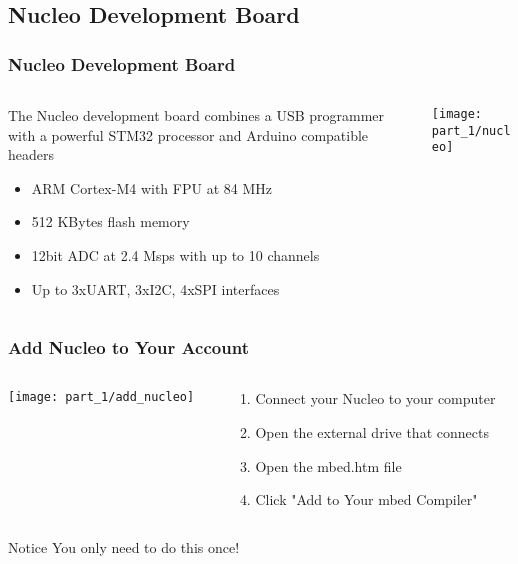 \subsection{Nucleo Development Board}
\begin{frame}
	\frametitle{Nucleo Development Board}
	\begin{columns}[T]
		\begin{column}{0.5\textwidth}
			The Nucleo development board combines a USB programmer with a powerful STM32 processor and Arduino compatible headers
			\begin{itemize}
				\item ARM Cortex-M4 with FPU at 84 MHz
				\item 512 KBytes flash memory
				\item 12bit ADC at 2.4 Msps with up to 10 channels
				\item Up to 3xUART, 3xI2C, 4xSPI interfaces
			\end{itemize}
		\end{column}
		\begin{column}{0.5\textwidth}
			\texttt{[image: part\_1/nucleo]}
		\end{column}
	\end{columns}
\end{frame}

\begin{frame}
	\frametitle{Add Nucleo to Your Account}
	\begin{columns}[c]
		\begin{column}{0.5\textwidth}
			\texttt{[image: part\_1/add\_nucleo]}
		\end{column}
		\begin{column}{0.5\textwidth}
			\begin{enumerate}
				\item Connect your Nucleo to your computer
				\item Open the external drive that connects
				\item Open the mbed.htm file
				\item Click "Add to Your mbed Compiler"
			\end{enumerate}
		\end{column}
	\end{columns}
	\begin{block}{Notice}
		You only need to do this once!
	\end{block}
\end{frame}

